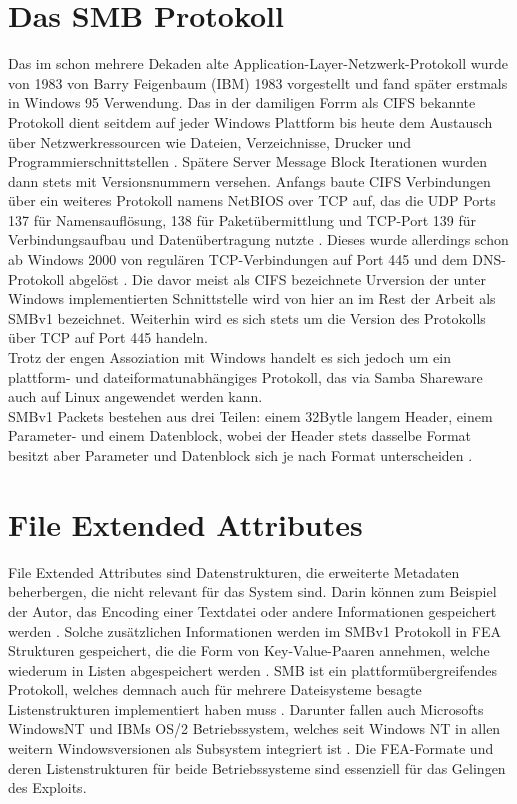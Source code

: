 \documentclass[DIV=12,headings=normal,pdftex,headinclude=false,footinclude=false,final]{scrreprt}
\begin{document}
\section{Das SMB Protokoll}\label{sec:SMB}
Das im schon mehrere Dekaden alte Application-Layer-Netzwerk-Protokoll\cite{Medium} wurde von 1983 von Barry Feigenbaum (IBM) 1983 vorgestellt und fand später erstmals in Windows 95 Verwendung. Das in der damiligen Forrm als CIFS bekannte Protokoll dient seitdem auf jeder Windows Plattform bis heute dem Austausch über Netzwerkressourcen wie Dateien, Verzeichnisse, Drucker und Programmierschnittstellen \cite{CompWeek:SMB}. Spätere Server Message Block Iterationen wurden dann stets mit Versionsnummern versehen. Anfangs baute CIFS Verbindungen über ein weiteres Protokoll namens NetBIOS over TCP auf, das die UDP Ports 137 für Namensauflösung, 138 für Paketübermittlung und TCP-Port 139 für Verbindungsaufbau und Datenübertragung nutzte \cite{MS:NetBIOS}. Dieses wurde allerdings schon ab Windows 2000 von regulären TCP-Verbindungen auf Port 445 und dem DNS-Protokoll abgelöst \cite{IONOS}. Die davor meist als CIFS bezeichnete Urversion der unter Windows implementierten Schnittstelle wird von hier an im Rest der Arbeit als SMBv1 bezeichnet. Weiterhin wird es sich stets um die Version des Protokolls über TCP auf Port 445 handeln.\\
Trotz der engen Assoziation mit Windows handelt es sich jedoch um ein plattform- und dateiformatunabhängiges Protokoll, das via Samba Shareware auch auf Linux angewendet werden kann\cite{IONOS}.\\
SMBv1 Packets bestehen aus drei Teilen: einem 32Bytle langem Header, einem Parameter- und einem Datenblock, wobei der Header stets dasselbe Format besitzt aber Parameter und Datenblock sich je nach Format unterscheiden \cite{MS:CIFS_MSG}.

\section{File Extended Attributes}\label{sec:FEA}
File Extended Attributes sind Datenstrukturen, die erweiterte Metadaten beherbergen, die nicht relevant für das System sind. Darin können zum Beispiel der Autor, das Encoding einer Textdatei oder andere Informationen gespeichert werden \cite{Wiki:FEA}. Solche zusätzlichen Informationen werden im SMBv1 Protokoll in FEA Strukturen gespeichert, die die Form von Key-Value-Paaren annehmen, welche wiederum in Listen abgespeichert werden \cite{CP}. SMB ist ein plattformübergreifendes Protokoll, welches demnach auch für mehrere Dateisysteme besagte Listenstrukturen implementiert haben muss \cite{CompWeek:SMB}. Darunter fallen auch Microsofts WindowsNT und IBMs OS/2 Betriebssystem, welches seit Windows NT in allen weitern Windowsversionen als Subsystem integriert ist \cite{MS:OS2Subsys}. Die FEA-Formate und deren Listenstrukturen für beide Betriebssysteme sind essenziell für das Gelingen des Exploits.
\end{document}
